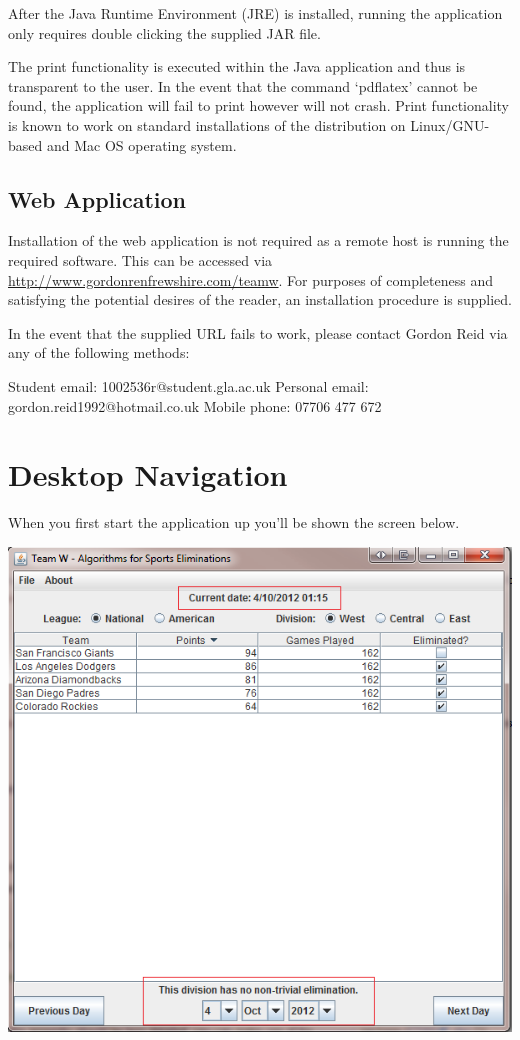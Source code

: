 After the Java Runtime Environment (JRE) is installed, running the application only requires double clicking the supplied JAR file.

The print functionality is executed within the Java application and thus is transparent to the user. In the event that the command `pdflatex' cannot be found, the application will fail to print however will not crash. Print functionality is known to work on standard installations of the distribution on Linux/GNU-based and Mac OS operating system.

\subsection{Web Application}

Installation of the web application is not required as a remote host is running the required software. This can be accessed via \url{http://www.gordonrenfrewshire.com/teamw}. For purposes of completeness and satisfying the potential desires of the reader, an installation procedure is supplied.

In the event that the supplied URL fails to work, please contact Gordon Reid via any of the following methods:

Student email: 1002536r@student.gla.ac.uk
Personal email: gordon.reid1992@hotmail.co.uk
Mobile phone: 07706 477 672

\section{Desktop Navigation}

When you first start the application up you'll be shown the screen below.

\includegraphics[width=\linewidth,keepaspectratio]{images/userManualDesk1.png}

